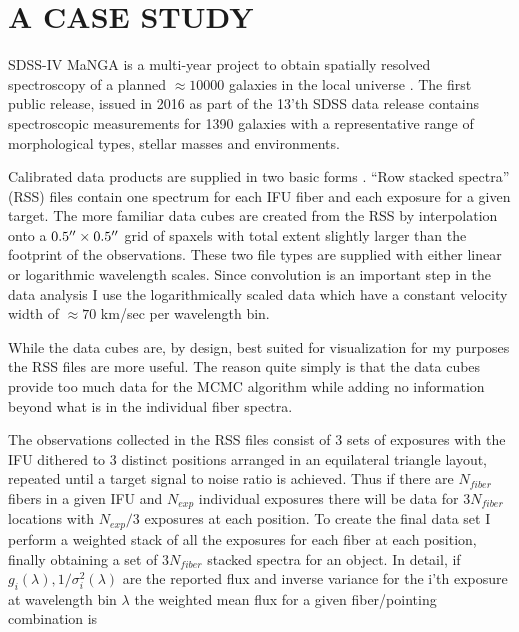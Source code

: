 \documentclass[modern]{aastex62}
\begin{document}
\section{A CASE STUDY}
\label{sec:study}

SDSS-IV MaNGA is a multi-year project to obtain spatially resolved spectroscopy of a planned $\approx 10000$ galaxies in the local universe \citep{2015ApJ...798....7B, 2015AJ....150...19L, 2016AJ....152..197Y}. The first public release, issued in 2016 as part of the 13'th SDSS data release \citep{2016arXiv160802013S} contains spectroscopic measurements for 1390 galaxies with a representative range of morphological types, stellar masses and environments.

Calibrated data products are supplied in two basic forms \citep{2016AJ....152...83L}. ``Row stacked spectra'' (RSS) files contain one spectrum for each IFU fiber and each exposure for a given target. The more familiar data cubes are created from the RSS by interpolation onto a $0.5\mbox{$^{\prime\prime}$} \times 0.5\mbox{$^{\prime\prime}$}$ grid of spaxels with total extent slightly larger than the footprint of the observations. These two file types are supplied with either linear or logarithmic wavelength scales. Since convolution is an important step in the data analysis I use the logarithmically scaled data which have a constant velocity width of $\approx 70$ km/sec per wavelength bin.

While the data cubes are, by design, best suited for visualization for my purposes the RSS files are more useful. The reason quite simply is that the data cubes provide too much data for the MCMC algorithm while adding no information beyond what is in the individual fiber spectra.

The observations collected in the RSS files consist of 3 sets of exposures with the IFU dithered to 3 distinct positions arranged in an equilateral triangle layout, repeated until a target signal to noise ratio is achieved. Thus if there  are $N_{fiber}$ fibers in a given IFU and $N_{exp}$ individual exposures there will be data for $3N_{fiber}$ locations with $N_{exp}/3$ exposures at each position. To create the final data set I perform a weighted stack of all the exposures for each fiber at each position, finally obtaining a set of $3N_{fiber}$ stacked spectra for an object. In detail, if $g_i(\lambda), 1/\sigma_i^2(\lambda)$ are the reported flux and inverse variance for the i'th exposure at wavelength bin $\lambda$ the weighted mean flux for a given fiber/pointing combination is
\end{document}
